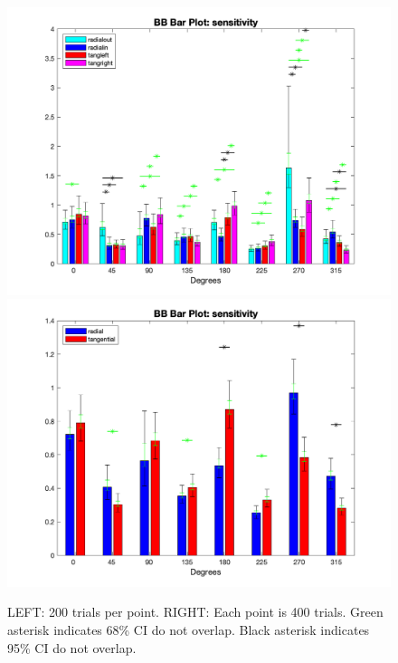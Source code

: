 \documentclass[11pt]{article} %
\begin{document}
\begin{figure}[H]
\centering %
\includegraphics[scale=.35]{Images/BB_BP_sensitivity_Alldata_4conds.png}
\includegraphics[scale=.35]{Images/BB_BP_sensitivity_Alldata_2conds.png}
\caption{LEFT: 200 trials per point. RIGHT: Each point is 400 trials. Green asterisk indicates 68\% CI do not overlap. Black asterisk indicates 95\% CI do not overlap.}
\end{figure}

\newpage
\end{document}
